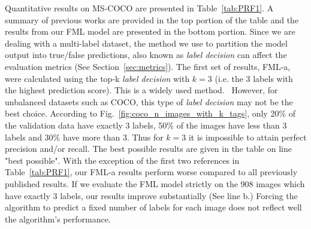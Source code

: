 \documentclass[12pt,journal,compsoc]{IEEEtran}
\begin{document}
Quantitative results on MS-COCO are presented in Table~\ref{tab:PRF1}. A summary of previous works are provided in the top portion of the table and the results from our FML model are presented in the bottom portion. Since we are dealing with a multi-label dataset, the method we use to partition the model output into true/false predictions, also known as \textit{label decision} can affect the evaluation metrics (See Section~\ref{sec:metrics}). The first set of results, FML-a, were calculated using the top-k \textit{label decision} with $k=3$ (i.e. the 3 labels with the highest prediction score).  This is a widely used method.~\cite{WangYMHHX16,ZhuLOYW17}  However, for unbalanced datasets such as COCO, this type of \textit{label decision} may not be the best choice. According to Fig.~\ref{fig:coco_n_images_with_k_tags}, only 20\% of the validation data have exactly 3 labels, 50\% of the images have less than 3 labels and 30\% have more than 3. Thus for $k=3$ it is impossible to attain perfect precision and/or recall. The best possible results are given in the table on line "best possible".  With the exception of the first two references in Table~\ref{tab:PRF1}, our FML-a results perform worse compared to all previously published results. If we evaluate the FML model strictly on the 908 images which have exactly 3 labels, our results improve substantially (See line b.) Forcing the algorithm to predict a fixed number of labels for each image does not reflect well the algorithm's performance.
\end{document}
